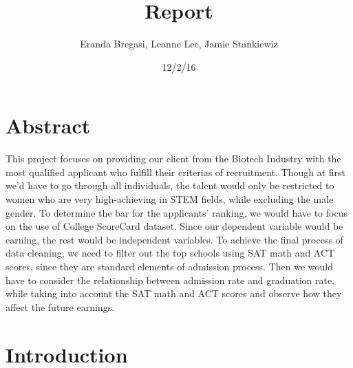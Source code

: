 \documentclass{article}
\begin{document}
\title{Report}
\author{Eranda Bregasi, Leanne Lee, Jamie Stankiewiz}
\date{12/2/16}
\maketitle






\section{Abstract}

This project focuses on providing our client from the Biotech Industry with the most qualified applicant who fulfill their criterias of recruitment. Though at first we'd have to go through all individuals, the talent would only be restricted to women who are very high-achieving in STEM fields, while excluding the male gender. To determine the bar for the applicants' ranking, we would have to focus on the use of College ScoreCard dataset. Since our dependent variable would be earning, the rest would be independent variables. To achieve the final process of data cleaning, we need to filter out the top schools using SAT math and ACT scores, since they are standard elements of admission process. Then we would have to consider the relationship between admission rate and graduation rate, while taking into account the SAT math and ACT scores and observe how they affect the future earnings.


\section{Introduction}
\end{document}
